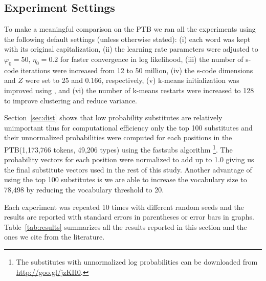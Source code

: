 \subsection{Experiment Settings}\label{sec:expset}

To make a meaningful comparison on the PTB we ran all the experiments
using the following default settings (unless otherwise stated): (i)
each word was kept with its original capitalization, (ii) the learning
rate parameters were adjusted to $\varphi_0=50$, $\eta_0=0.2$ for
faster convergence in log likelihood, (iii) the number of s-code
iterations were increased from 12 to 50 million, (iv) the s-code
dimensions and $Z$ were set to 25 and 0.166, respectively, (v) k-means
initialization was improved using \cite{arthur2007k}, and (vi) the
number of k-means restarts were increased to 128 to improve clustering
and reduce variance.

Section~\ref{sec:dist} shows that low probability substitutes are
relatively unimportant thus for computational efficiency only the top
100 substitutes and their unnormalized probabilities were computed for
each positions in the PTB(1,173,766 tokens, 49,206 types) using the
{\sc fastsubs} algorithm \cite{yuret2021fastsub}\footnote{The
  substitutes with unnormalized log probabilities can be downloaded
  from \mbox{\url{http://goo.gl/jzKH0}}.}.  The probability vectors
for each position were normalized to add up to 1.0 giving us the final
substitute vectors used in the rest of this study.  Another advantage
of using the top 100 substitutes is we are able to increase the
vocabulary size to 78,498 by reducing the vocabulary threshold to 20.

Each experiment was repeated 10 times with different random seeds and
the results are reported with standard errors in parentheses or error
bars in graphs.  Table~\ref{tab:results} summarizes all the results
reported in this section and the ones we cite from the literature.

